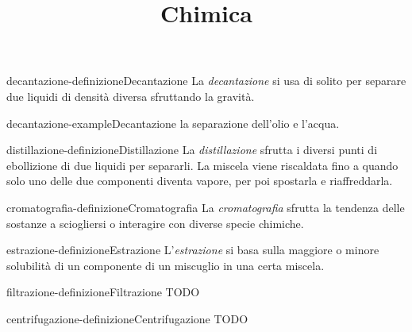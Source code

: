 \documentclass[preview]{standalone}
\begin{document}
\title{Chimica}
\genpage

\begin{snippetdefinition}{decantazione-definizione}{Decantazione}
    La \textit{decantazione} si usa di solito per separare due liquidi di densità diversa
    sfruttando la gravità.
\end{snippetdefinition}

\begin{snippetexample}{decantazione-example}{Decantazione}
    la separazione dell'olio e l'acqua.
\end{snippetexample}

\begin{snippetdefinition}{distillazione-definizione}{Distillazione}
    La \textit{distillazione} sfrutta i diversi punti di ebollizione di due liquidi per separarli.
    La miscela viene riscaldata fino a quando solo uno delle due componenti diventa vapore, per poi
    spostarla e riaffreddarla.
\end{snippetdefinition}

\begin{snippetdefinition}{cromatografia-definizione}{Cromatografia}
    La \textit{cromatografia} sfrutta la tendenza delle sostanze a sciogliersi o interagire
    con diverse specie chimiche.
\end{snippetdefinition}

\begin{snippetdefinition}{estrazione-definizione}{Estrazione}
    L'\textit{estrazione} si basa sulla maggiore o minore solubilità di un componente di un miscuglio in una certa miscela.
\end{snippetdefinition}

\begin{snippetdefinition}{filtrazione-definizione}{Filtrazione}
    TODO
\end{snippetdefinition}

\begin{snippetdefinition}{centrifugazione-definizione}{Centrifugazione}
    TODO
\end{snippetdefinition}
\end{document}
